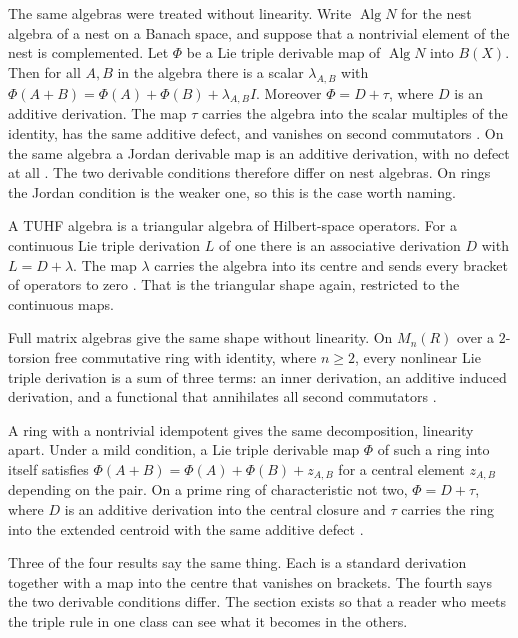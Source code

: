 The same algebras were treated without linearity. Write $\operatorname{Alg}N$ for
the nest algebra of a nest on a Banach space, and suppose that a nontrivial
element of the nest is complemented. Let $\Phi$ be a Lie triple derivable map of
$\operatorname{Alg}N$ into $B(X)$. Then for all $A,B$ in the algebra there is a
scalar $\lambda_{A,B}$ with
$\Phi(A+B)=\Phi(A)+\Phi(B)+\lambda_{A,B}I$. Moreover $\Phi = D + \tau$, where $D$
is an additive derivation. The map $\tau$ carries the algebra into the scalar
multiples of the identity, has the same additive defect, and vanishes on second
commutators \cite[Abstract, p.~653]{LiFang2013LieTripleNest}.
On the same algebra a Jordan derivable map is an additive derivation, with no
defect at all \cite[Abstract, p.~653]{LiFang2013LieTripleNest}.
The two derivable conditions therefore differ on nest algebras. On rings the
Jordan condition is the weaker one, so this is the case worth naming.

A TUHF algebra is a triangular algebra of Hilbert-space operators. For a
continuous Lie triple derivation $L$ of one there is an associative derivation $D$
with $L = D + \lambda$.
The map $\lambda$ carries the algebra into its centre and sends every bracket of
operators to zero \cite[Abstract, p.~399]{JiWang2005TUHF}.
That is the triangular shape again, restricted to the continuous maps.

Full matrix algebras give the same shape without linearity. On $M_{n}(R)$ over a
$2$-torsion free commutative ring with identity, where $n\ge 2$, every nonlinear
Lie triple derivation is a sum of three terms: an inner derivation, an additive
induced derivation, and a functional that annihilates all second commutators
\cite[Abstract, p.~77]{XiaoWei2013NonlinearLieTriple}.

A ring with a nontrivial idempotent gives the same decomposition, linearity apart.
Under a mild condition, a Lie triple derivable map $\Phi$ of such a ring into
itself satisfies $\Phi(A+B)=\Phi(A)+\Phi(B)+z_{A,B}$ for a central element
$z_{A,B}$ depending on the pair. On a prime ring of characteristic not two,
$\Phi = D + \tau$, where $D$ is an additive derivation into the central closure
and $\tau$ carries the ring into the extended centroid with the same additive
defect \cite[Abstract]{LiFangLuWang2014LieTripleDerivable}.

Three of the four results say the same thing. Each is a standard derivation
together with a map into the centre that vanishes on brackets.
The fourth says the two derivable conditions differ.
The section exists so that a reader who meets the triple rule in one class can
see what it becomes in the others.


